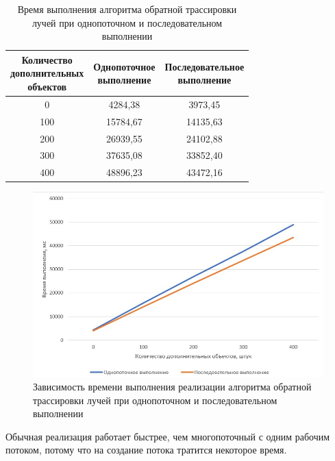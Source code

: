 \begin{table}[H]
	\begin{center}
		\caption{\label{tab:single}Время выполнения алгоритма обратной трассировки лучей при однопоточном и последовательном выполнении}
		\begin{tabular}{|c|c|c|}
			\hline
			\makecell{Количество\\ дополнительных\\ объектов}&	\makecell{Однопоточное \\выполнение}&	\makecell{Последовательное\\ выполнение} \\ [4ex]
			\hline
			0&	4284,38&	3973,45\\
			\hline
			100&	15784,67&	14135,63\\
			\hline
			200&	26939,55&	24102,88\\
			\hline
			300&	37635,08&	33852,40\\
			\hline
			400&	48896,23&	43472,16\\
			\hline
		\end{tabular}
	\end{center}
\end{table}
\captionsetup{justification=centering,singlelinecheck=false}
\begin{figure}[H]
	\centering
	\includegraphics{inc/img/single_fig}
	\caption{Зависимость времени выполнения реализации алгоритма обратной трассировки лучей при однопоточном  и последовательном выполнении}
	\label{fig:single}
\end{figure}

Обычная реализация работает быстрее, чем многопоточный с одним рабочим потоком, потому что на создание потока тратится некоторое время.

